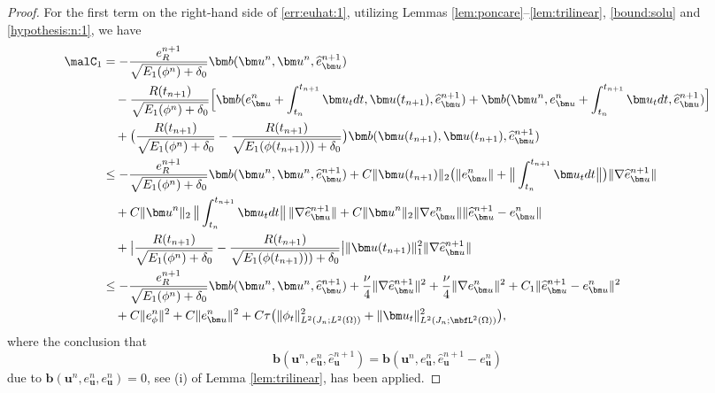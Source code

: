 \begin{proof}
	For the first term on the right-hand side of \eqref{err:euhat:1}, utilizing Lemmas \ref{lem:poncare}--\ref{lem:trilinear}, \eqref{bound:solu}  and \eqref{hypothesis:n:1}, we have
	\begin{equation*} 
		\begin{aligned}
			{\malC}_1 
			& = -\frac{e_R^{n+1}}{\sqrt{E_1(\phi^n)+\delta_0}} \bm b(\bm u^n,  \bm u^n, \widehat{e}_{\bm u}^{n+1} ) \\
			& \quad - \frac{R(t_{n+1})}{\sqrt{E_1(\phi^n)+\delta_0}} \Big[ \bm b(e_{\bm u}^n +\int_{t_n}^{t_{n+1}} \bm u_t d t, \bm u(t_{n + 1}), \widehat{e}_{\bm u}^{n+1}) +  \bm b (\bm u^n, e_{\bm u}^n +\int_{t_n}^{t_{n+1}} \bm u_t d t, \widehat{e}_{\bm u}^{n+1})  \Big]\\
			& \quad + \big(\frac{R(t_{n+1})}{\sqrt{E_1(\phi^n)+\delta_0}} - \frac{R(t_{n+1})}{\sqrt{E_1(\phi(t_{n+1})))+\delta_0}} \big) \bm b(\bm u(t_{n + 1}), \bm u(t_{n+1}),\widehat{e}_{\bm u}^{n+1})  \\ 
			& \leq -\frac{e_R^{n+1}}{\sqrt{E_1(\phi^n)+\delta_0}} \bm b(\bm u^n,  \bm u^n, \widehat{e}_{\bm u}^{n+1} ) + C  \|\bm u(t_{n+1})\|_2   \big(\|e_{\bm u}^n\|+\big\|\int_{t_n}^{t_{n+1}} \bm u_t d t\big\| \big) \|\nabla \widehat{e}_{\bm u}^{n+1}\|  \\
			& \quad + C\|{\bm u}^n\|_2\, \big\|\int_{t_n}^{t_{n+1}} \bm u_t d t\big\| \,  
			\|\nabla \widehat{e}_{\bm u}^{n+1}\|+   C\|{\bm u}^n\|_2 \|\nabla e_{\bm u}^n\| \|\widehat{e}_{\bm u}^{n+1}-e_{\bm u}^n\|   \\
			& \quad + \big|\frac{R(t_{n+1})}{\sqrt{E_1(\phi^n)+\delta_0}} - \frac{R(t_{n+1})}{\sqrt{E_1(\phi(t_{n+1})))+\delta_0}} \big|  \|\bm u(t_{n + 1})\|_1^2 \|\nabla \widehat{e}_{\bm u}^{n+1}\| \\
			& \leq -\frac{e_R^{n+1}}{\sqrt{E_1(\phi^n)+\delta_0}} \bm b(\bm u^n,  \bm u^n, \widehat{e}_{\bm u}^{n+1} ) +  \frac{\nu}{4}\|\nabla \widehat{e}_{\bm u}^{n+1}\|^2 + \frac{\nu}{4} \|\nabla e_{\bm u}^n\|^2 + C_1 \|\widehat{e}_{\bm u}^{n+1}-e_{\bm u}^n\|^2\\ %
			& \quad  +C\|e_{\phi}^n\|^2 + C\|e_{\bm u}^n\|^2
			+ C \tau \big( \|\phi_t\|_{L^2(J_n ; L^2(\Omega))}^2  + \|\bm u_t\|_{L^2(J_n;\mbfL^2(\Omega))}^2 \big),
		\end{aligned}
	\end{equation*}
	where the conclusion that
	\begin{equation*}
		\bm b (\bm u^n, e_{\bm u}^n, \widehat{e}_{\bm u}^{n+1}) = \bm b (\bm u^n, e_{\bm u}^n,\widehat{e}_{\bm u}^{n+1}-e_{\bm u}^n) 
	\end{equation*}
	due to $\bm b (\bm u^n, e_{\bm u}^n,e_{\bm u}^n)=0$, see (i) of Lemma  \ref{lem:trilinear}, has been applied. 
	

\end{proof}
